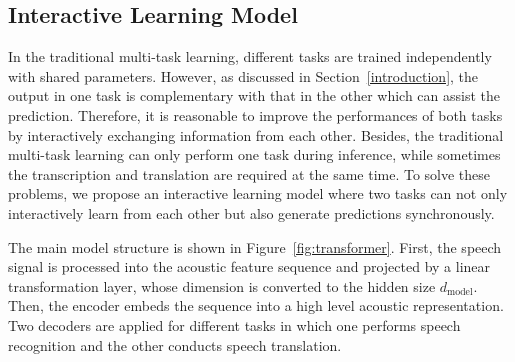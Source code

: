 \documentclass[letterpaper]{article} %
\begin{document}
\subsection{Interactive Learning Model}
In the traditional multi-task learning, different tasks are trained independently with shared parameters. However, as discussed in Section~\ref{introduction}, the output in one task is complementary with that in the other which can assist the prediction. Therefore, it is reasonable to improve the performances of both tasks by interactively exchanging information from each other. Besides, the traditional multi-task learning can only perform one task during inference, while sometimes the transcription and translation are required at the same time. To solve these problems, we propose an interactive learning model where two tasks can not only interactively learn from each other but also generate predictions synchronously.

The main model structure is shown in Figure~\ref{fig:transformer}. First, the speech signal is processed into the acoustic feature sequence and projected by a linear transformation layer, whose dimension is converted to the hidden size $d_{\textrm{model}}$. Then, the encoder embeds the sequence into a high level acoustic representation. Two decoders are applied for different tasks in which one performs speech recognition and the other conducts speech translation.
\end{document}
